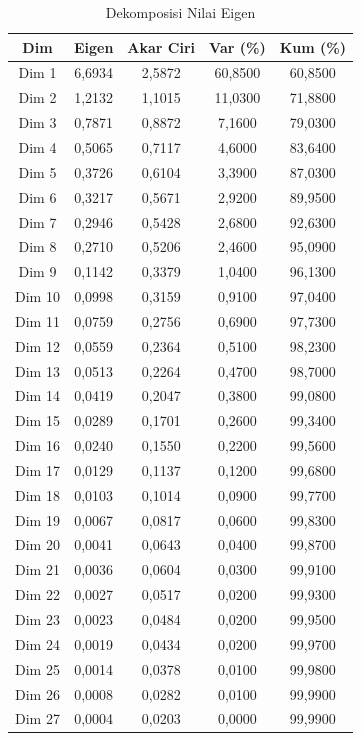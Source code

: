 \begin{table}[H]
\centering
\caption{Dekomposisi Nilai Eigen} \label{tab:eigen}
\begin{tabular}{|c|c|c|c|c|}
\hline
\textbf{Dim} & \textbf{Eigen} & \textbf{Akar Ciri} & \textbf{Var (\%)} & \textbf{Kum (\%)} \\
\hline
Dim 1 & 6,6934 & 2,5872 & 60,8500 & 60,8500 \\
Dim 2 & 1,2132 & 1,1015 & 11,0300 & 71,8800 \\
Dim 3 & 0,7871 & 0,8872 & 7,1600 & 79,0300 \\
Dim 4 & 0,5065 & 0,7117 & 4,6000 & 83,6400 \\
Dim 5 & 0,3726 & 0,6104 & 3,3900 & 87,0300 \\
Dim 6 & 0,3217 & 0,5671 & 2,9200 & 89,9500 \\
Dim 7 & 0,2946 & 0,5428 & 2,6800 & 92,6300 \\
Dim 8 & 0,2710 & 0,5206 & 2,4600 & 95,0900 \\
Dim 9 & 0,1142 & 0,3379 & 1,0400 & 96,1300 \\
Dim 10 & 0,0998 & 0,3159 & 0,9100 & 97,0400 \\
Dim 11 & 0,0759 & 0,2756 & 0,6900 & 97,7300 \\
Dim 12 & 0,0559 & 0,2364 & 0,5100 & 98,2300 \\
Dim 13 & 0,0513 & 0,2264 & 0,4700 & 98,7000 \\
Dim 14 & 0,0419 & 0,2047 & 0,3800 & 99,0800 \\
Dim 15 & 0,0289 & 0,1701 & 0,2600 & 99,3400 \\
Dim 16 & 0,0240 & 0,1550 & 0,2200 & 99,5600 \\
Dim 17 & 0,0129 & 0,1137 & 0,1200 & 99,6800 \\
Dim 18 & 0,0103 & 0,1014 & 0,0900 & 99,7700 \\
Dim 19 & 0,0067 & 0,0817 & 0,0600 & 99,8300 \\
Dim 20 & 0,0041 & 0,0643 & 0,0400 & 99,8700 \\
Dim 21 & 0,0036 & 0,0604 & 0,0300 & 99,9100 \\
Dim 22 & 0,0027 & 0,0517 & 0,0200 & 99,9300 \\
Dim 23 & 0,0023 & 0,0484 & 0,0200 & 99,9500 \\
Dim 24 & 0,0019 & 0,0434 & 0,0200 & 99,9700 \\
Dim 25 & 0,0014 & 0,0378 & 0,0100 & 99,9800 \\
Dim 26 & 0,0008 & 0,0282 & 0,0100 & 99,9900 \\
Dim 27 & 0,0004 & 0,0203 & 0,0000 & 99,9900 \\

\end{tabular}
\end{table}
